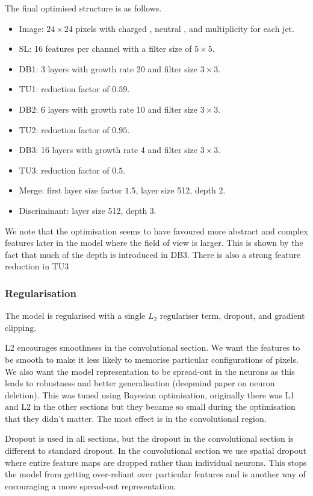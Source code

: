 The final optimised structure is as follows.
\begin{itemize}[noitemsep]
    \item Image: $24\times{24}$ pixels with charged \pt, neutral \pt, and multiplicity for each jet.
    \item SL: 16 features per channel with a filter size of $5\times{}5$.
    \item DB1: 3 layers with growth rate 20 and filter size $3\times{}3$.
    \item TU1: reduction factor of $0.59$.
    \item DB2: 6 layers with growth rate 10 and filter size $3\times{}3$.
    \item TU2: reduction factor of $0.95$.
    \item DB3: 16 layers with growth rate 4 and filter size $3\times{}3$.
    \item TU3: reduction factor of $0.5$.
    \item Merge: first layer size factor $1.5$, layer size 512, depth 2.
    \item Discriminant: layer size 512, depth 3.
\end{itemize}
We note that the optimisation seems to have favoured more abstract and complex features later in the model where the field of view is larger. This is shown by the fact that much of the depth is introduced in DB3. 
There is also a strong feature reduction in TU3 




\subsubsection{Regularisation}
The model is regularised with a single $L_2$ regulariser term, dropout, and gradient clipping.

L2 encourages smoothness in the convolutional section. We want the features to be smooth to make it less likely to memorise particular configurations of pixels. 
We also want the model representation to be spread-out in the neurons as this leads to robustness and better generalisation (deepmind paper on neuron deletion).
This was tuned using Bayesian optimisation, originally there was L1 and L2 in the other sections but they became so small during the optimisation that they didn't matter. The most effect is in the convolutional region. 

Dropout is used in all sections, but the dropout in the convolutional section is different to standard dropout. In the convolutional section we use spatial dropout where entire feature maps are dropped rather than individual neurons. 
This stops the model from getting over-reliant over particular features and is another way of encouraging a more spread-out representation. 



